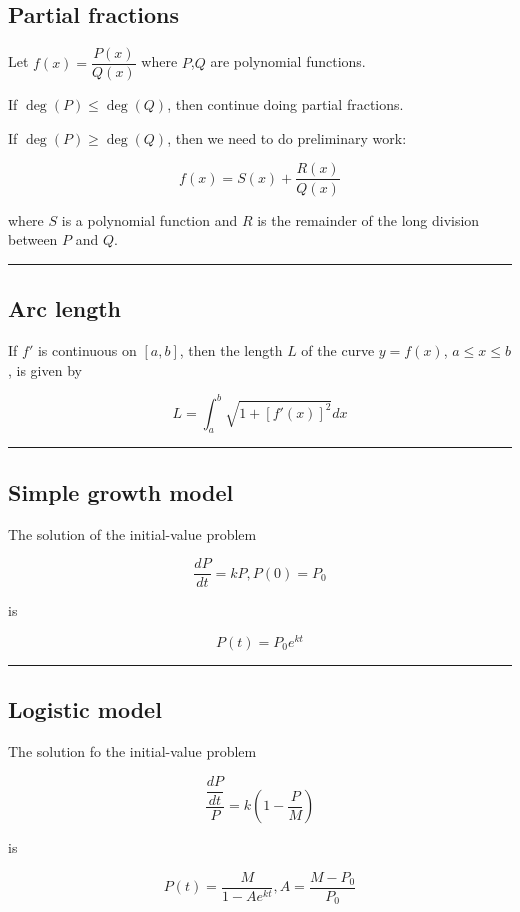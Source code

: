 \documentclass[
  landscape,  
  10pt,
]{article}
\begin{document}
\begin{multicols}{3}

\hypertarget{partial-fractions}{%
\subsection{Partial fractions}\label{partial-fractions}}

Let \(f(x) = \dfrac{P(x)}{Q(x)}\) where \(P\),\(Q\) are polynomial
functions.

If \(\deg(P) \leq \deg(Q)\), then continue doing partial fractions.

If \(\deg(P) \geq \deg(Q)\), then we need to do preliminary work:

\[ f(x) = S(x) + \frac{R(x)}{Q(x)} \]

where \(S\) is a polynomial function and \(R\) is the remainder of the
long division between \(P\) and \(Q\).

\begin{center}\rule{0.5\linewidth}{0.5pt}\end{center}

\hypertarget{arc-length}{%
\subsection{Arc length}\label{arc-length}}

If \(f'\) is continuous on \([a,b]\), then the length \(L\) of the curve
\(y = f(x)\), \(a \leq x \leq b\), is given by

\[ L = \int_a^b \sqrt{1+[f'(x)]^2}dx \]

\begin{center}\rule{0.5\linewidth}{0.5pt}\end{center}

\hypertarget{simple-growth-model}{%
\subsection{Simple growth model}\label{simple-growth-model}}

The solution of the initial-value problem

\[ \frac{dP}{dt} = kP, P(0) = P_0 \]

is

\[P(t) = P_0e^{kt} \]

\begin{center}\rule{0.5\linewidth}{0.5pt}\end{center}

\hypertarget{logistic-model}{%
\subsection{Logistic model}\label{logistic-model}}

The solution fo the initial-value problem

\[\dfrac{\dfrac{dP}{dt}}{P} = k \left(1-\frac{P}{M}\right)\]

is

\[ P(t) = \frac{M}{1-Ae^{kt}}, A = \frac{M-P_0}{P_0} \]


\end{multicols}
\end{document}
